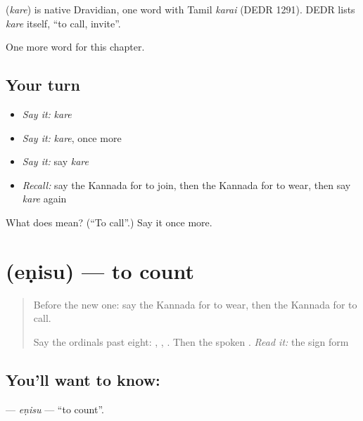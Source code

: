 \begin{cousinweb}
\textbf{} (\emph{kare}) is native Dravidian, one word with Tamil \emph{karai} (DEDR 1291). DEDR lists \emph{kare} itself, \textquotedblleft{}to call, invite\textquotedblright{}.
\end{cousinweb}

\begin{grammarlens}[title={What you've built}]
One more word for this chapter.
\end{grammarlens}

\subsection*{Your turn}
\begin{itemize}
\raggedright
  \item \emph{Say it:} \emph{kare}
  \item \emph{Say it:} \emph{kare}, once more
  \item \emph{Say it:} say \emph{kare}
  \item \emph{Recall:} say the Kannada for to join, then the Kannada for to wear, then say \emph{kare} again
\end{itemize}

\begin{tcolorbox}[breakable,colback=teal!4,colframe=teal!35!black,title={Before you move on}]
What does  mean? (\textquotedblleft{}To call\textquotedblright{}.) Say it once more.
\end{tcolorbox}
\section[\texorpdfstring{\kn{ಎಣಿಸು} (eṇisu)}{ಎಣಿಸು (eṇisu)}]{ (eṇisu) — to count}

\label{lesson:KA-C149-enisu}



\begin{quote}
Before the new one: say the Kannada for to wear, then the Kannada for to call.

Say the ordinals past eight: \textbf{}, \textbf{}, \textbf{}. Then the spoken \textbf{}. \emph{Read it:} the sign form \textbf{}
\end{quote}

\subsection*{You'll want to know: }
\textbf{} — \emph{eṇisu} — \textquotedblleft{}to count\textquotedblright{}.

